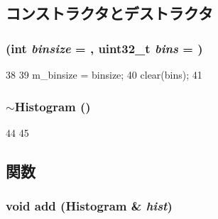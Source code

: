 \subsection{コンストラクタとデストラクタ}
\hypertarget{classHistogram_a0be7c28fa0c035b0409c970625b6ebe9}{
\subsubsection[{Histogram}]{ (int {\em binsize} = {}, \/  {\bf uint32\_\-t} {\em bins} = {})}}
\label{classHistogram_a0be7c28fa0c035b0409c970625b6ebe9}



\begin{DoxyCode}
38 {
39     m_binsize = binsize;
40     clear(bins);
41 }
\end{DoxyCode}
\hypertarget{classHistogram_a17481d27b81a3cc32c8a688e020ece88}{
\subsubsection[{$\sim$Histogram}]{\setlength{\rightskip}{0pt plus 5cm}$\sim${\bf Histogram} ()}}
\label{classHistogram_a17481d27b81a3cc32c8a688e020ece88}



\begin{DoxyCode}
44 {
45 }
\end{DoxyCode}


\subsection{関数}
\hypertarget{classHistogram_a6972d61e24903eef8ec9dad439b69cdd}{
\subsubsection[{add}]{\setlength{\rightskip}{0pt plus 5cm}void add ({\bf Histogram} \& {\em hist})}}
\label{classHistogram_a6972d61e24903eef8ec9dad439b69cdd}



